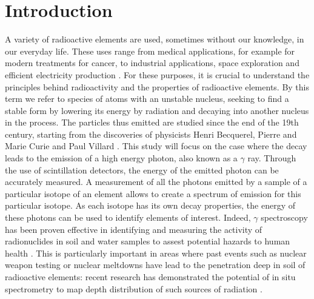 \section{Introduction}
A variety of radioactive elements are used, sometimes without our knowledge, in our everyday life.
These uses range from medical applications, for example for modern treatments for cancer, to industrial applications, space exploration and efficient electricity production \cite{andrea_galindo_what_2023} \cite{esa_radiation}.
For these purposes, it is crucial to understand the principles behind radioactivity and the properties of radioactive elements.
By this term we refer to species of atoms with an unstable nucleus, seeking to find a stable form by lowering its energy by radiation and decaying into another nucleus in the process.
The particles thus emitted are studied since the end of the 19th century, starting from the discoveries of physicists Henri Becquerel, Pierre and Marie Curie and Paul Villard \cite{britannica_atom}.
This study will focus on the case where the decay leads to the emission of a high energy photon, also known as a \(\gamma\) ray.
Through the use of scintillation detectors, the energy of the emitted photon can be accurately measured.
A measurement of all the photons emitted by a sample of a particular isotope of an element allows to create a spectrum of emission for this particular isotope.
As each isotope has its own decay properties, the energy of these photons can be used to identify elements of interest.
Indeed, $\gamma$ spectroscopy has been proven effective in identifying and measuring the activity of radionuclides in soil and water samples to assest potential hazards to human health \cite{ramadhany_assessment_2022} \cite{kim_design_2022}.
This is particularly important in areas where past events such as nuclear weapon testing or nuclear meltdowns have lead to the penetration deep in soil of radioactive elements: 
recent research has demonstrated the potential of in situ spectrometry to map depth distribution of such sources of radiation \cite{varley_situ_2017}.
